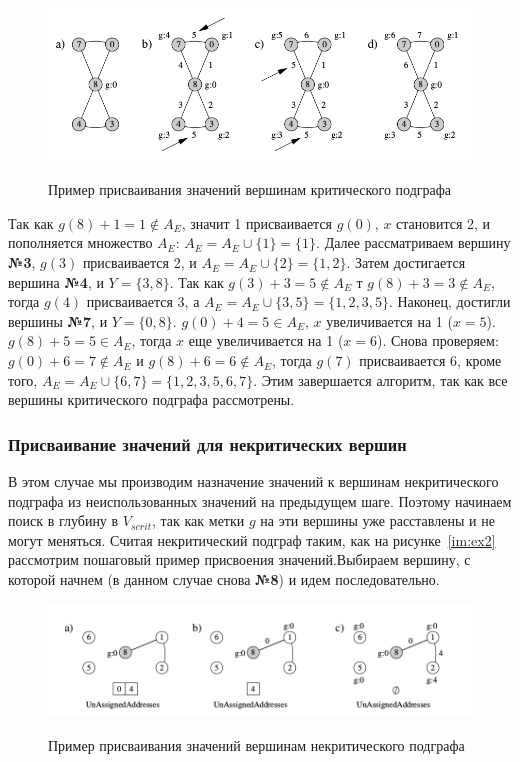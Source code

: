\documentclass[specialist,
               substylefile = spbu.rtx,
               subf,href,colorlinks=true, 12pt]{disser}
\begin{document}
\begin{figure}[h]
\begin{center}
\includegraphics[scale=0.35]{imgs/ex3.jpg}\label{im:ex3}
\caption{Пример присваивания значений вершинам критического подграфа}
\end{center}
\end{figure}


Так как $g(8) + 1 = 1 \notin A_E$, значит 1 присваивается $g(0)$, $x$ становится 2, и пополняется множество $A_E$: $A_E = A_E \cup \{1\} = \{1\}$. Далее рассматриваем вершину \textbf{№3}, $g(3)$ присваивается 2,  и $A_E = A_E \cup \{2\} = \{1,2\}$. Затем достигается вершина \textbf{№4}, и $Y = \{3,8\}$. Так как $g(3) + 3 = 5 \notin A_E$ т $g(8) + 3 = 3 \notin A_E$, тогда $g(4)$ присваивается 3, а $A_E = A_E \cup \{3,5\} = \{1,2,3,5\}$. Наконец, достигли вершины \textbf{№7}, и $Y = \{0,8\}$. $g(0) + 4 = 5 \in A_E$, $x$ увеличивается на 1 ($x = 5$). $g(8) + 5 = 5 \in A_E$, тогда $x$ еще увеличивается на 1 ($x = 6$). Снова проверяем: $g(0) + 6 = 7 \notin A_E$ и $g(8) + 6 = 6 \notin A_E$, тогда $g(7)$ присваивается 6, кроме того, $A_E = A_E \cup \{6,7\} = \{1,2,3,5,6,7\}$. Этим завершается алгоритм, так как все вершины критического подграфа рассмотрены.

\subsubsection{Присваивание значений для некритических вершин}

В этом случае мы производим назначение значений к вершинам некритического подграфа из неиспользованных значений на предыдущем шаге. Поэтому начинаем поиск в глубину в $V_{scrit}$, так как метки $g$ на эти вершины уже расставлены и не могут меняться. Считая некритический подграф таким, как на рисунке~\ref{im:ex2} рассмотрим пошаговый пример присвоения значений.Выбираем вершину, с которой начнем (в данном случае снова \textbf{№8}) и идем последовательно.

\begin{figure}[h]
\begin{center}
\includegraphics[scale=0.35]{imgs/ex4.jpg}\label{im:ex4}
\caption{Пример присваивания значений вершинам некритического подграфа}
\end{center}
\end{figure}
\end{document}
